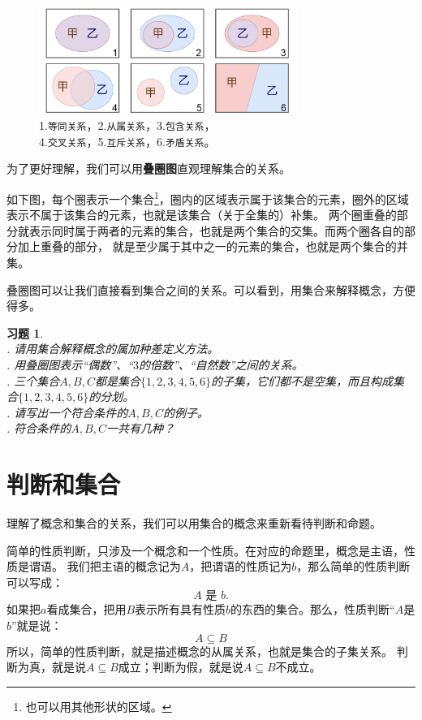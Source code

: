 \documentclass[12pt,UTF8]{ctexbook}
\theoremstyle{definition}
\theoremstyle{plain}
\newtheorem{xt}{习题}[section]
\begin{document}
\begin{figure}[h]
    \vspace{4pt}
    \centering
    \includegraphics[width=0.75\textwidth]{tu/概念的关系1.png}
    \captionsetup{justification=centering}
    \caption*{1.\texttt{等同关系}，2.\texttt{从属关系}，3.\texttt{包含关系}，\\4.\texttt{交叉关系}，5.\texttt{互斥关系}，6.\texttt{矛盾关系}。}
\end{figure}

为了更好理解，我们可以用\textbf{叠圈图}直观理解集合的关系。

如下图，每个圈表示一个集合\footnote{也可以用其他形状的区域。}，圈内的区域表示属于该集合的元素，圈外的区域表示不属于该集合的元素，也就是该集合（关于全集的）补集。
两个圈重叠的部分就表示同时属于两者的元素的集合，也就是两个集合的交集。而两个圈各自的部分加上重叠的部分，
就是至少属于其中之一的元素的集合，也就是两个集合的并集。

叠圈图可以让我们直接看到集合之间的关系。可以看到，用集合来解释概念，方便得多。

\begin{xt}\label{xt:2-0-20}
    \mbox{} \\ 
    . 请用集合解释概念的属加种差定义方法。\\
    . 用叠圈图表示“偶数”、“$3$的倍数”、“自然数”之间的关系。\\
    . 三个集合$A,B,C$都是集合$\{1,2,3,4,5,6\}$的子集，它们都不是空集，而且构成集合$\{1,2,3,4,5,6\}$的分划。\\
    . 请写出一个符合条件的$A,B,C$的例子。\\
    . 符合条件的$A,B,C$一共有几种？
\end{xt}

\section{判断和集合}
理解了概念和集合的关系，我们可以用集合的概念来重新看待判断和命题。

简单的性质判断，只涉及一个概念和一个性质。在对应的命题里，概念是主语，性质是谓语。
我们把主语的概念记为$A$，把谓语的性质记为$b$，那么简单的性质判断可以写成：
$$ A \,\,\mbox{是} \,\,b. $$
如果把$a$看成集合，把用$B$表示所有具有性质$b$的东西的集合。那么，性质判断“$A$是$b$”就是说：
$$A \subseteq B$$
所以，简单的性质判断，就是描述概念的从属关系，也就是集合的子集关系。
判断为真，就是说$A \subseteq B$成立；判断为假，就是说$A \subseteq B$不成立。
\end{document}
